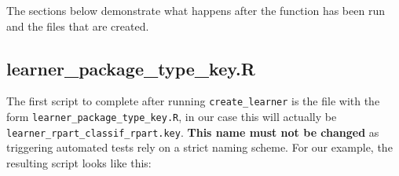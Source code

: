 \documentclass[
]{scrbook}
\begin{document}
The sections below demonstrate what happens after the function has been run and the files that are created.

\hypertarget{learner_package_type_key.r}{%
\subsection{learner\_package\_type\_key.R}\label{learner_package_type_key.r}}

The first script to complete after running \texttt{create\_learner} is the file with the form \texttt{learner\_package\_type\_key.R}, in our case this will actually be \texttt{learner\_rpart\_classif\_rpart.key}. \textbf{This name must not be changed} as triggering automated tests rely on a strict naming scheme. For our example, the resulting script looks like this:
\end{document}
